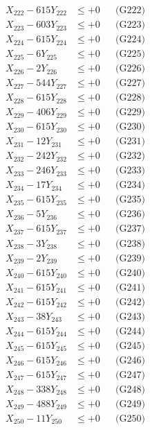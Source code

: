 \documentclass[a4paper,10pt]{article}
\begin{document}
{\begin{align}
X_{222} - 615Y_{222} &\leq +0 && \text{(G222)} \\
X_{223} - 603Y_{223} &\leq +0 && \text{(G223)} \\
X_{224} - 615Y_{224} &\leq +0 && \text{(G224)} \\
X_{225} - 6Y_{225} &\leq +0 && \text{(G225)} \\
X_{226} - 2Y_{226} &\leq +0 && \text{(G226)} \\
X_{227} - 544Y_{227} &\leq +0 && \text{(G227)} \\
X_{228} - 615Y_{228} &\leq +0 && \text{(G228)} \\
X_{229} - 406Y_{229} &\leq +0 && \text{(G229)} \\
X_{230} - 615Y_{230} &\leq +0 && \text{(G230)} \\
\allowbreak
X_{231} - 12Y_{231} &\leq +0 && \text{(G231)} \\
X_{232} - 242Y_{232} &\leq +0 && \text{(G232)} \\
X_{233} - 246Y_{233} &\leq +0 && \text{(G233)} \\
X_{234} - 17Y_{234} &\leq +0 && \text{(G234)} \\
X_{235} - 615Y_{235} &\leq +0 && \text{(G235)} \\
X_{236} - 5Y_{236} &\leq +0 && \text{(G236)} \\
X_{237} - 615Y_{237} &\leq +0 && \text{(G237)} \\
X_{238} - 3Y_{238} &\leq +0 && \text{(G238)} \\
X_{239} - 2Y_{239} &\leq +0 && \text{(G239)} \\
X_{240} - 615Y_{240} &\leq +0 && \text{(G240)} \\
\allowbreak
X_{241} - 615Y_{241} &\leq +0 && \text{(G241)} \\
X_{242} - 615Y_{242} &\leq +0 && \text{(G242)} \\
X_{243} - 38Y_{243} &\leq +0 && \text{(G243)} \\
X_{244} - 615Y_{244} &\leq +0 && \text{(G244)} \\
X_{245} - 615Y_{245} &\leq +0 && \text{(G245)} \\
X_{246} - 615Y_{246} &\leq +0 && \text{(G246)} \\
X_{247} - 615Y_{247} &\leq +0 && \text{(G247)} \\
X_{248} - 338Y_{248} &\leq +0 && \text{(G248)} \\
X_{249} - 488Y_{249} &\leq +0 && \text{(G249)} \\
X_{250} - 11Y_{250} &\leq +0 && \text{(G250)} \\

\end{align}}
\end{document}
